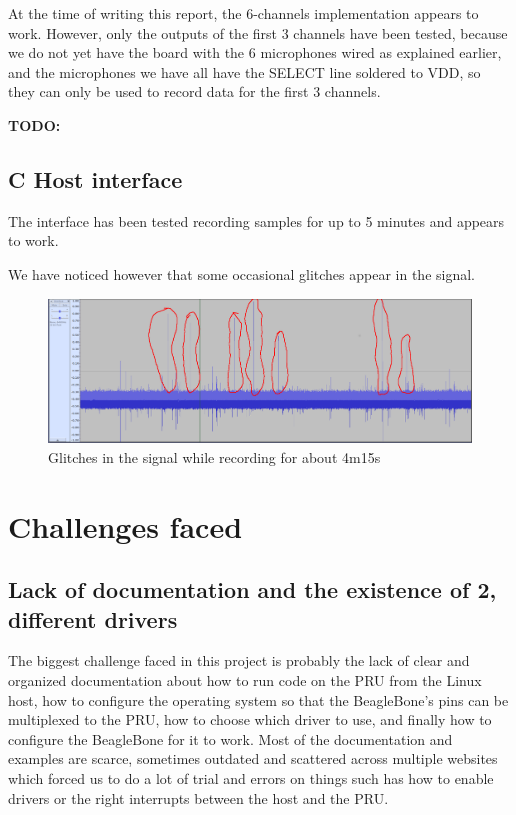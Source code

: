 \documentclass[]{report}
\begin{document}
At the time of writing this report, the 6-channels implementation
appears to work. However, only the outputs of the first 3 channels have
been tested, because we do not yet have the board with the 6 microphones
wired as explained earlier, and the microphones we have all have the
SELECT line soldered to VDD, so they can only be used to record data for
the first 3 channels.

\textbf{TODO:}

\hypertarget{c-host-interface}{%
\section{C Host interface}\label{c-host-interface}}

The interface has been tested recording samples for up to 5 minutes and
appears to work.

We have noticed however that some occasional glitches appear in the
signal.

\begin{figure}[h]
\centering
\includegraphics[width=0.8\linewidth]{Pictures/glitches_circled.png}
\caption{Glitches in the signal while recording for about 4m15s}
\end{figure}

\hypertarget{challenges-faced}{%
\chapter{Challenges faced}\label{challenges-faced}}

\hypertarget{lack-of-documentation-and-the-existence-of-2-different-drivers}{%
\section{Lack of documentation and the existence of 2, different
drivers}\label{lack-of-documentation-and-the-existence-of-2-different-drivers}}

The biggest challenge faced in this project is probably the lack of
clear and organized documentation about how to run code on the PRU from
the Linux host, how to configure the operating system so that the
BeagleBone's pins can be multiplexed to the PRU, how to choose which
driver to use, and finally how to configure the BeagleBone for it to
work. Most of the documentation and examples are scarce, sometimes
outdated and scattered across multiple websites which forced us to do a
lot of trial and errors on things such has how to enable drivers or the
right interrupts between the host and the PRU.
\end{document}
